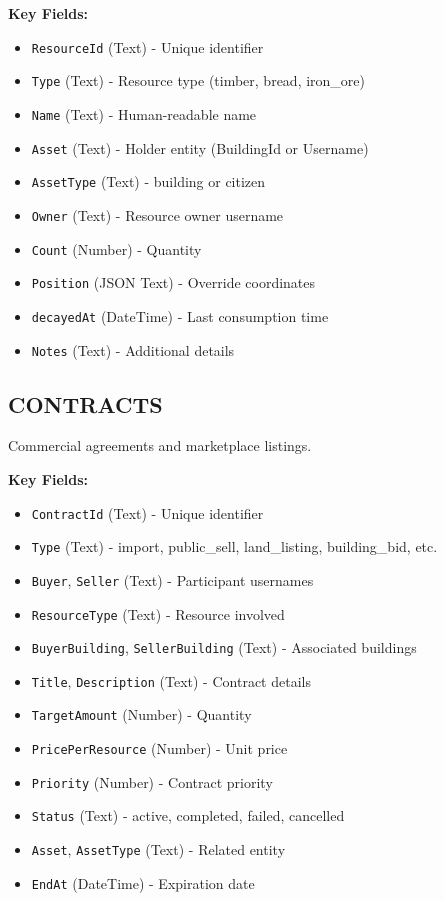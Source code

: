 \documentclass[11pt,a4paper]{article}
\begin{document}
\textbf{Key Fields:}
\begin{itemize}
\item \texttt{ResourceId} (Text) - Unique identifier
\item \texttt{Type} (Text) - Resource type (timber, bread, iron\_ore)
\item \texttt{Name} (Text) - Human-readable name
\item \texttt{Asset} (Text) - Holder entity (BuildingId or Username)
\item \texttt{AssetType} (Text) - building or citizen
\item \texttt{Owner} (Text) - Resource owner username
\item \texttt{Count} (Number) - Quantity
\item \texttt{Position} (JSON Text) - Override coordinates
\item \texttt{decayedAt} (DateTime) - Last consumption time
\item \texttt{Notes} (Text) - Additional details
\end{itemize}

\subsection{CONTRACTS}

Commercial agreements and marketplace listings.

\textbf{Key Fields:}
\begin{itemize}
\item \texttt{ContractId} (Text) - Unique identifier
\item \texttt{Type} (Text) - import, public\_sell, land\_listing, building\_bid, etc.
\item \texttt{Buyer}, \texttt{Seller} (Text) - Participant usernames
\item \texttt{ResourceType} (Text) - Resource involved
\item \texttt{BuyerBuilding}, \texttt{SellerBuilding} (Text) - Associated buildings
\item \texttt{Title}, \texttt{Description} (Text) - Contract details
\item \texttt{TargetAmount} (Number) - Quantity
\item \texttt{PricePerResource} (Number) - Unit price
\item \texttt{Priority} (Number) - Contract priority
\item \texttt{Status} (Text) - active, completed, failed, cancelled
\item \texttt{Asset}, \texttt{AssetType} (Text) - Related entity
\item \texttt{EndAt} (DateTime) - Expiration date
\end{itemize}
\end{document}
